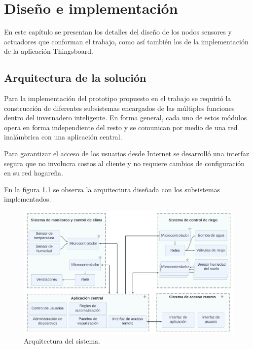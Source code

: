 \chapter{Diseño e implementación} %

\label{Chapter3} %



En este capítulo se presentan los detalles del diseño de los nodos sensores y actuadores que conforman el trabajo, como así también los de la implementación de la aplicación Thingsboard.

\section{Arquitectura de la solución}
\label{sec:Arquitectura de la solución}


Para la implementación del prototipo propuesto en el trabajo se requirió la construcción de diferentes subsistemas encargados de las múltiples funciones dentro del invernadero inteligente. En forma general, cada uno de estos módulos opera en forma independiente del resto y se comunican por medio de una red inalámbrica con una aplicación central. 

Para garantizar el acceso de los usuarios desde Internet se desarrolló una interfaz segura que no involucra costos al cliente y no requiere cambios de configuración en su red hogareña.

En la figura \ref{fig:blockdiagram} se observa la arquitectura diseñada con los subsistemas implementados.


\begin{figure}[h]
	\centering
	\includegraphics[width=1.0\textwidth]{./Figures/blockdiagram4.jpg}
	\caption[Arquitectura del sistema.]{Arquitectura del sistema.}
	\label{fig:blockdiagram}

\end{figure}

